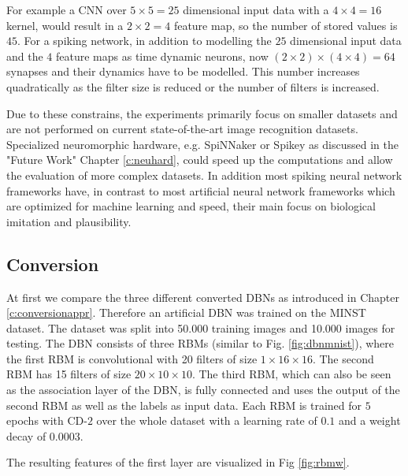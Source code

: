 For example a CNN over $5 \times 5 = 25$ dimensional input data with a $4 \times 4 = 16$ kernel, would result in a $2 \times 2 = 4$ feature map, so the number of stored values is $45$. 
For a spiking network, in addition to modelling the $25$ dimensional input data and the $4$ feature maps as time dynamic neurons, now $(2 \times 2) \times (4 \times 4) = 64$ synapses and their dynamics have to be modelled.
This number increases quadratically as the filter size is reduced or the number of filters is increased.

Due to these constrains, the experiments primarily focus on smaller datasets and are not performed on current state-of-the-art image recognition datasets. 
Specialized neuromorphic hardware, e.g. SpiNNaker or Spikey as discussed in the "Future Work" Chapter \ref{c:neuhard}, could speed up the computations and allow the evaluation of more complex datasets.  
In addition most spiking neural network frameworks have, in contrast to most artificial neural network frameworks which are optimized for machine learning and speed, their main focus on biological imitation and plausibility.


\subsection{Conversion} \label{c:conversionexp}

At first we compare the three different converted DBNs as introduced in Chapter \ref{c:conversionappr}.
Therefore an artificial DBN was trained on the MINST dataset.
The dataset was split into 50.000 training images and 10.000 images for testing.
The DBN consists of three RBMs (similar to Fig. \ref{fig:dbnmnist}), where the first RBM is convolutional with 20 filters of size $1 \times 16 \times 16$. 
The second RBM has 15 filters of size $20 \times 10 \times 10$. 
The third RBM, which can also be seen as the association layer of the DBN, is fully connected and uses the output of the second RBM as well as the labels as input data.  
Each RBM is trained for $5$ epochs with CD-$2$ over the whole dataset with a learning rate of $0.1$ and a weight decay of $0.0003$.

The resulting features of the first layer are visualized in Fig \ref{fig:rbmw}.

